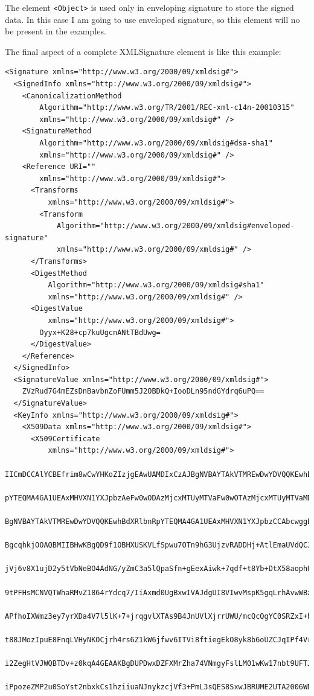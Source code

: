 The element \texttt{<Object>} is used only in enveloping signature to store
the signed data. In this case I am going to use enveloped signature, so this
element will no be present in the examples.

The final aspect of a complete XMLSignature element is like this example:

\begin{lstlisting}
<Signature xmlns="http://www.w3.org/2000/09/xmldsig#">  
  <SignedInfo xmlns="http://www.w3.org/2000/09/xmldsig#">  
    <CanonicalizationMethod  
        Algorithm="http://www.w3.org/TR/2001/REC-xml-c14n-20010315"  
        xmlns="http://www.w3.org/2000/09/xmldsig#" />  
    <SignatureMethod  
        Algorithm="http://www.w3.org/2000/09/xmldsig#dsa-sha1"  
        xmlns="http://www.w3.org/2000/09/xmldsig#" />  
    <Reference URI=""  
        xmlns="http://www.w3.org/2000/09/xmldsig#">  
      <Transforms  
          xmlns="http://www.w3.org/2000/09/xmldsig#">  
        <Transform  
            Algorithm="http://www.w3.org/2000/09/xmldsig#enveloped-signature"
            xmlns="http://www.w3.org/2000/09/xmldsig#" />  
      </Transforms>  
      <DigestMethod  
          Algorithm="http://www.w3.org/2000/09/xmldsig#sha1"  
          xmlns="http://www.w3.org/2000/09/xmldsig#" />  
      <DigestValue
          xmlns="http://www.w3.org/2000/09/xmldsig#">  
        Oyyx+K28+cp7kuUgcnANtTBdUwg=  
      </DigestValue>
    </Reference>  
  </SignedInfo>  
  <SignatureValue xmlns="http://www.w3.org/2000/09/xmldsig#">  
    ZVzRud7G4mEZsDnBavbnZoFUmm5J2OBDkQ+IooDLn95ndGYdrq6uPQ==  
  </SignatureValue>  
  <KeyInfo xmlns="http://www.w3.org/2000/09/xmldsig#">  
    <X509Data xmlns="http://www.w3.org/2000/09/xmldsig#">  
      <X509Certificate  
          xmlns="http://www.w3.org/2000/09/xmldsig#">  
        IICmDCCAlYCBEfrim8wCwYHKoZIzjgEAwUAMDIxCzAJBgNVBAYTAkVTMREwDwYDVQQKEwhBd
        pYTEQMA4GA1UEAxMHVXN1YXJpbzAeFw0wODAzMjcxMTUyMTVaFw0wOTAzMjcxMTUyMTVaMDI
        BgNVBAYTAkVTMREwDwYDVQQKEwhBdXRlbnRpYTEQMA4GA1UEAxMHVXN1YXJpbzCCAbcwggEs
        BgcqhkjOOAQBMIIBHwKBgQD9f1OBHXUSKVLfSpwu7OTn9hG3UjzvRADDHj+AtlEmaUVdQCJR
        jVj6v8X1ujD2y5tVbNeBO4AdNG/yZmC3a5lQpaSfn+gEexAiwk+7qdf+t8Yb+DtX58aophUP
        9tPFHsMCNVQTWhaRMvZ1864rYdcq7/IiAxmd0UgBxwIVAJdgUI8VIwvMspK5gqLrhAvwWBz1
        APfhoIXWmz3ey7yrXDa4V7l5lK+7+jrqgvlXTAs9B4JnUVlXjrrUWU/mcQcQgYC0SRZxI+hM
        t88JMozIpuE8FnqLVHyNKOCjrh4rs6Z1kW6jfwv6ITVi8ftiegEkO8yk8b6oUZCJqIPf4Vrl
        i2ZegHtVJWQBTDv+z0kqA4GEAAKBgDUPDwxDZFXMrZha74VNmgyFslLM01wKw17nbt9UFTJA
        iPpozeZMP2u0SoYst2nbxkCs1hziiuaNJnykzcjVf3+PmL3sQES8SxwJBRUME2UTA2006WD3

\end{lstlisting}
